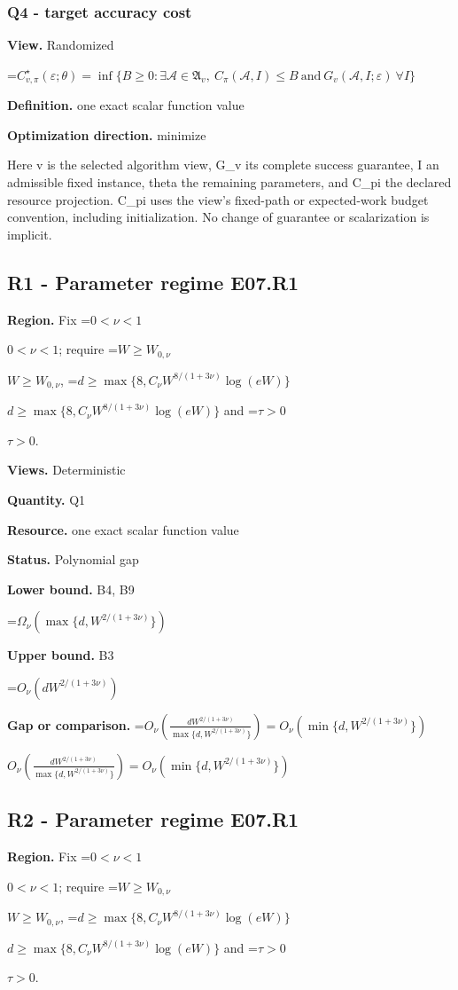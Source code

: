 \documentclass[10pt,a4paper]{article}
\newcommand{\AtlasMath}[1]{\par\begingroup\centering\setbox0=\hbox{$\displaystyle #1$}\ifdim\wd0>1.4\linewidth\typeout{ATLAS WIDE FORMULA: \the\wd0}\fi\ifdim\wd0>\linewidth\resizebox{\linewidth}{!}{\box0}\else\box0\fi\par\endgroup}
\newcommand{\AtlasInlineMath}[1]{\begingroup\setbox0=\hbox{$#1$}\ifdim\wd0>.4\linewidth\endgroup\AtlasMath{#1}\else\endgroup$#1$\fi}
\begin{document}
\subsubsection{Q4 - target accuracy cost}
\textbf{View.} Randomized

\AtlasMath{C^\star_{v,\pi}(\varepsilon;\theta)=\inf\{B\ge0:\exists\mathcal A\in\mathfrak A_v,\ C_\pi(\mathcal A,I)\le B\ \text{and}\ G_v(\mathcal A,I;\varepsilon)\ \forall I\}}
\textbf{Definition.} one exact scalar function value

\textbf{Optimization direction.} minimize

Here v is the selected algorithm view, G\_\allowbreak{}v its complete success guarantee, I an admissible fixed instance, theta the remaining parameters, and C\_\allowbreak{}pi the declared resource projection. C\_\allowbreak{}pi uses the view's fixed-path or expected-work budget convention, including initialization. No change of guarantee or scalarization is implicit.

\subsection{R1 - Parameter regime E07.R1}
\textbf{Region.} Fix \AtlasInlineMath{0<\nu<1}; require \AtlasInlineMath{W\ge W_{0,\nu}}, \AtlasInlineMath{d\ge\max\{8,C_\nu W^{8/(1+3\nu)}\log(eW)\}} and \AtlasInlineMath{\tau>0}.

\textbf{Views.} Deterministic

\textbf{Quantity.} Q1

\textbf{Resource.} one exact scalar function value

\textbf{Status.} Polynomial gap

\textbf{Lower bound.} B4, B9

\AtlasMath{\Omega_\nu(\max\{d,W^{2/(1+3\nu)}\})}
\textbf{Upper bound.} B3

\AtlasMath{O_\nu(d W^{2/(1+3\nu)})}
\textbf{Gap or comparison.} \AtlasInlineMath{O_\nu\!\left(\frac{dW^{2/(1+3\nu)}}{\max\{d,W^{2/(1+3\nu)}\}}\right)=O_\nu(\min\{d,W^{2/(1+3\nu)}\})}

\subsection{R2 - Parameter regime E07.R1}
\textbf{Region.} Fix \AtlasInlineMath{0<\nu<1}; require \AtlasInlineMath{W\ge W_{0,\nu}}, \AtlasInlineMath{d\ge\max\{8,C_\nu W^{8/(1+3\nu)}\log(eW)\}} and \AtlasInlineMath{\tau>0}.
\end{document}
